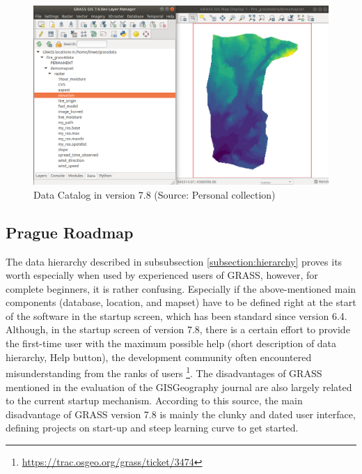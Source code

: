 \documentclass[a4paper,10pt,twoside]{article}
\begin{document}
\vspace{0.3cm}
\begin{figure}[hbt!] 
\begin{center}
\includegraphics[width=17cm]{../pictures/data_catalog_pred.png} 
\caption[Data Catalog in version 7.8]{Data Catalog in version 7.8 (Source: Personal collection)}
\label{fig:data_catalog_pred}
\end{center}
\end{figure}

\newpage
\vspace*{-1cm}
\subsection{Prague Roadmap}
\label{section:Prague Roadmap}
\noindent
\large
The data hierarchy described in subsubsection \ref{subsection:hierarchy} proves its worth especially when used by experienced users of GRASS, however, for complete beginners, it is rather confusing. Especially if the above-mentioned main components (database, location, and mapset) have to be defined right at the start of the software in the startup screen, which has been standard since version 6.4.  Although, in the startup screen of version 7.8, there is a certain effort to provide the first-time user with the maximum possible help (short description of data hierarchy, Help button), the development community often encountered misunderstanding from the ranks of users \footnote{\url{https://trac.osgeo.org/grass/ticket/3474}}. The disadvantages of GRASS mentioned in the evaluation of the GISGeography journal \cite{gisgeography} are also largely related to the current startup mechanism. According to this source, the main disadvantage of GRASS version 7.8 is mainly the clunky and dated user interface, defining projects on start-up and steep learning curve to get started.
\end{document}
